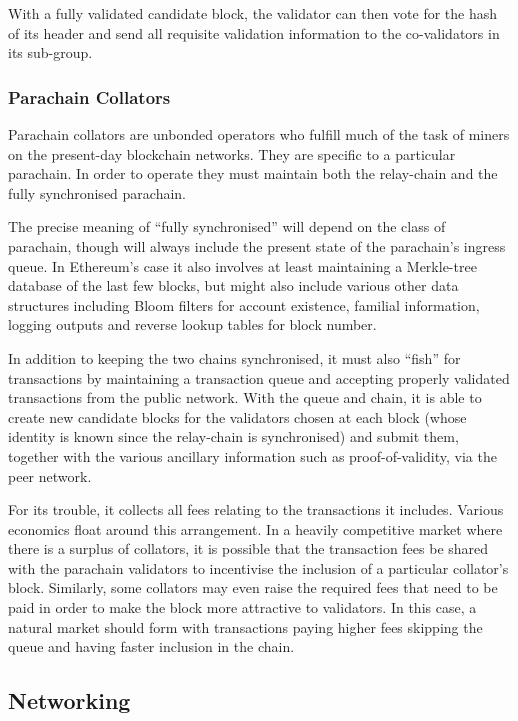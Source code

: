 \documentclass[9pt,oneside]{amsart}
\begin{document}
\begin{multicols}{2}
 With a fully validated candidate block, the validator can then vote for the hash of its header and send all requisite validation information to the co-validators in its sub-group.

\subsubsection{Parachain Collators}\label{parachain-collators}

 Parachain collators are unbonded operators who fulfill much of the task of miners on the present-day blockchain networks. They are specific to a particular parachain. In order to operate they must maintain both the relay-chain and the fully synchronised parachain.

 The precise meaning of ``fully synchronised'' will depend on the class of parachain, though will always include the present state of the parachain's ingress queue. In Ethereum's case it also involves at least maintaining a Merkle-tree database of the last few blocks, but might also include various other data structures including Bloom filters for account existence, familial information, logging outputs and reverse lookup tables for block number.

 In addition to keeping the two chains synchronised, it must also ``fish'' for transactions by maintaining a transaction queue and accepting properly validated transactions from the public network. With the queue and chain, it is able to create new candidate blocks for the validators chosen at each block (whose identity is known since the relay-chain is synchronised) and submit them, together with the various ancillary information such as proof-of-validity, via the peer network.

 For its trouble, it collects all fees relating to the transactions it includes. Various economics float around this arrangement. In a heavily competitive market where there is a surplus of collators, it is possible that the transaction fees be shared with the parachain validators to incentivise the inclusion of a particular collator's block. Similarly, some collators may even raise the required fees that need to be paid in order to make the block more attractive to validators. In this case, a natural market should form with transactions paying higher fees skipping the queue and having faster inclusion in the chain.

\subsection{Networking}\label{networking}


\end{multicols}
\end{document}
